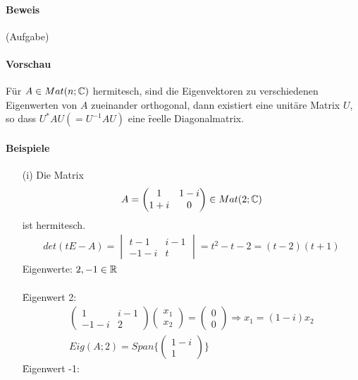 \paragraph{Beweis}
(Aufgabe)

\paragraph{Vorschau}
Für $A \in Mat(n; \mathbb{C})$ hermitesch, sind die Eigenvektoren zu verschiedenen Eigenwerten von $A$ zueinander orthogonal, dann existiert eine unitäre Matrix $U$, so dass $U^{*} A U (=U^{-1} A U)$ eine \f{reelle Diagonalmatrix}.

\paragraph{Beispiele}
\begin{itemize}
\item[(i)] Die Matrix
\begin{align}
A = \begin{pmatrix} 1 & 1-i \\ 1+i & 0 \end{pmatrix} \in Mat(2; \mathbb{C})
\end{align}
ist hermitesch.
\begin{align}
det(t E - A) = \begin{vmatrix} t-1 & i-1 \\ -1-i & t \end{vmatrix} = t^2 -t - 2 = (t-2) (t+1)
\end{align}
Eigenwerte: $2, -1 \in \mathbb{R}$ \\\\
\f{Eigenwert 2}:
\begin{align}
\begin{pmatrix} 1 & i-1 \\ -1-i & 2\end{pmatrix} \begin{pmatrix} x_1 \\ x_2 \end{pmatrix} = \begin{pmatrix} 0 \\ 0 \end{pmatrix} \Rightarrow x_1 = (1-i) x_2 \\
Eig(A; 2) = Span\{\begin{pmatrix} 1 - i \\ 1 \end{pmatrix}\}
\end{align}
\f{Eigenwert -1}:

\end{itemize}
